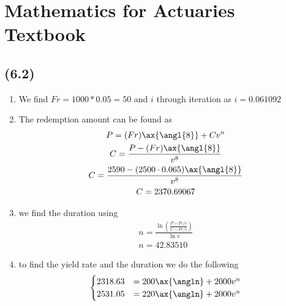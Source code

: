 \documentclass[a4paper, 12pt, reqno]{amsart}
\title{\titl}
\author{Moritz M. Konarski}
\date{\today}
\begin{document}
\maketitle

\section*{Mathematics for Actuaries Textbook}

\subsection*{(6.2)} 

\begin{enumerate}
    \item We find $Fr = 1000 * 0.05 = 50$ and $i$ through iteration as
        $i=0.061092$
    \item The redemption amount can be found as
        \begin{equation}\nonumber
            \begin{gathered}
                P = (Fr) \ax{\angl{8}} + Cv^n   \\
                C = \frac{P - (Fr)\ax{\angl{8}}}{v^8}   \\
                C = \frac{2590 - (2500 \cdot 0.065)\ax{\angl{8}}}{v^8}   \\
                C = 2370.69067
            \end{gathered}
        \end{equation}
    \item we find the duration using 
        \begin{equation}\nonumber
            \begin{gathered}
                n = \frac{\ln \left( \frac{P - Fr/i}{C - Fr/i}\right)}{\ln v}\\
                n = 42.83510
            \end{gathered}
        \end{equation}
    \item to find the yield rate and the duration we do the following
        \begin{equation}\nonumber
            \begin{gathered}
                \begin{cases}
                    2318.63 &= 200\ax{\angln} + 2000 v^n    \\
                    2531.05 &= 220\ax{\angln} + 2000 v^n    \\
                \end{cases}\\

\end{gathered}
\end{equation}
\end{enumerate}
\end{document}
